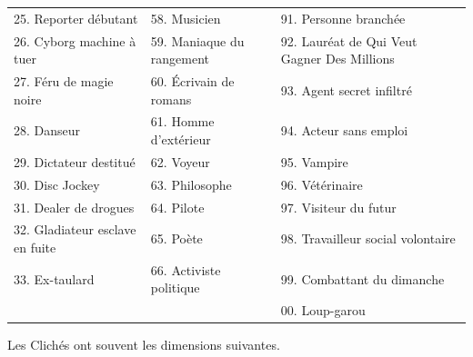 \begin{frame}[b]
\begin{tabular}{p{5.55cm}p{5.55cm}p{5.55cm}}
25. Reporter débutant & 58. Musicien & 91. Personne branchée \\
26. Cyborg machine à tuer & 59. Maniaque du rangement & 92. Lauréat de Qui Veut Gagner Des Millions \\
27. Féru de magie noire & 60. Écrivain de romans & 93. Agent secret infiltré \\
28. Danseur & 61. Homme d'extérieur & 94. Acteur sans emploi \\
29. Dictateur destitué & 62. Voyeur & 95. Vampire \\
30. Disc Jockey & 63. Philosophe & 96. Vétérinaire \\
31. Dealer de drogues & 64. Pilote & 97. Visiteur du futur \\
32. Gladiateur esclave en fuite & 65. Poète & 98. Travailleur social volontaire \\
33. Ex-taulard & 66. Activiste politique & 99. Combattant du dimanche \\
& & 00. Loup-garou \\
\end{tabular}


Les Clichés ont souvent les dimensions suivantes.

\vspace{0.2cm}


\end{frame}
